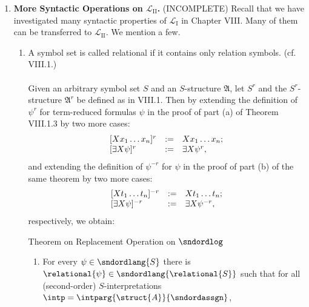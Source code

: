 \begin{enumerate}[1.]
\begin{enumerate}[(1)]
\begin{center}
$(\left[ P^A \right]^\struct{A}, \gamma) \models \psi$ \ \ \ iff \ \ \ $(\struct{A}, \gamma) \models \psi^P$;
\end{center}
and hence obtains:\smallskip\\
\begin{theorem}{Relativization Lemma for $\sndordlog$} Let $\struct{A}$ be an $S \cup \{ P \}$-structure such that $P \not\in S$ and $P$ is unary. Suppose the set $P^A \subset A$ is $S$-closed in $\struct{A}$. Then for all second-order $S$-sentences $\psi$,\smallskip\\
$\left[ P^A \right]^\struct{A} \models \psi$ \quad iff \quad $\struct{A} \models \psi^P$.\qed
\end{theorem}
\end{enumerate}
%
\item \textbf{More Syntactic Operations on $\mathcal{L}_\mathrm{II}$.} (INCOMPLETE) Recall that we have investigated many syntactic properties of $\mathcal{L}_\mathrm{I}$ in Chapter VIII. Many of them can be transferred to $\mathcal{L}_\mathrm{II}$. We mention a few.
\begin{enumerate}[(1)]
\item A symbol set is called relational if it contains only relation symbols. (cf. VIII.1.)\\
\ \\
Given an arbitrary symbol set $S$ and an $S$-structure $\mathfrak{A}$, let $S^r$ and the $S^r$-structure $\mathfrak{A}^r$ be defined as in VIII.1. Then by extending the definition of $\psi^r$ for term-reduced formulas $\psi$ in the proof of part (a) of Theorem VIII.1.3 by two more cases:
\[
\begin{array}{lll}
[X x_1 \ldots x_n]^r & := & X x_1 \ldots x_n; \cr
[\exists X \psi ]^r  & := & \exists X \psi^r,
\end{array}
\]
and extending the definition of $\psi^{-r}$ for $\psi$ in the proof of part (b) of the same theorem by two more cases:
\[
\begin{array}{lll}
[X t_1 \ldots t_n]^{-r} & := & X t_1 \ldots t_n; \cr
[\exists X \psi ]^{-r}  & := & \exists X \psi^{-r},
\end{array}
\]
respectively, we obtain:\medskip\\
\begin{theorem}{Theorem on Replacement Operation on $\sndordlog$}
\begin{enumerate}[\rm(a)]
\item For every $\psi \in \sndordlang{S}$ there is $\relational{\psi} \in \sndordlang{\relational{S}}$ such that for all (second-order) $S$-interpretations $\intp = \intparg{\struct{A}}{\sndordassgn}$,\\

\end{enumerate}
\end{theorem}
\end{enumerate}
\end{enumerate}
